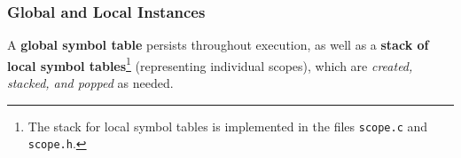 \subsubsection{Global and Local Instances}
A \textbf{global symbol table} persists throughout execution, as well as a \textbf{stack of local symbol tables}\footnote{The stack for local symbol tables is implemented in the files \texttt{scope.c} and \texttt{scope.h}.} (representing individual scopes), which are \textit{created, stacked, and popped} as needed.

